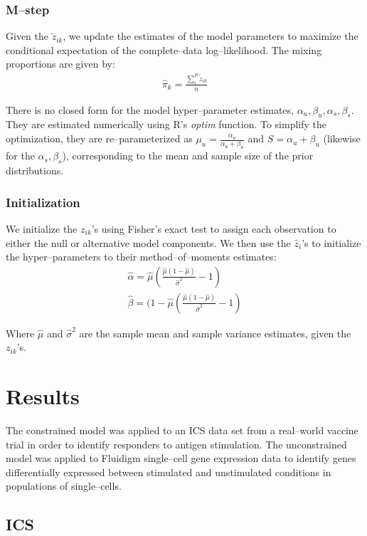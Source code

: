 \documentclass[11pt]{article}
\begin{document}
\subsubsection{M--step}
Given the $\tilde{z}_{ik}$, we update the estimates of the model parameters to maximize the conditional expectation of the complete--data log--likelihood. The mixing proportions are given by:
\begin{align}
\hat\pi_k = \frac{ \sum_i^P \tilde z_{ik}}{n}
\end{align}

There is no closed form for the model hyper--parameter estimates, $\alpha_u,\beta_u,\alpha_s,\beta_s$. They are estimated numerically using R's \textit{optim} function. To simplify the optimization, they are re--parameterized as $\mu_u=\frac{\alpha_u}{\alpha_u+\beta_u}$ and $S=\alpha_u+\beta_u$ (likewise for the $\alpha_s,\beta_s$), corresponding to the mean and sample size of the prior distributions. 

\subsubsection{Initialization}
We initialize the $z_{ik}$'s using Fisher's exact test to assign each observation to either the null or alternative model components. We then use the $\hat{z}_i$'s to initialize the hyper--parameters to their method--of--moments estimates:
\begin{align}
\hat{\alpha} = \hat{\mu}\left(\frac{\hat{\mu}(1-\hat{\mu})}{\hat{\sigma}^2} -1\right)\\
\hat{\beta} =  (1-\hat{\mu}\left(\frac{\hat{\mu}(1-\hat{\mu})}{\hat{\sigma}^2} -1\right)
\end{align}

Where $\hat{\mu}$ and $\hat{\sigma}^2$ are the sample mean and sample variance estimates, given the $z_{ik}$'s.

\section{Results}
The constrained model was applied to an ICS data set from a real--world vaccine trial in order to identify responders to antigen stimulation. The unconstrained model was applied to Fluidigm single--cell gene expression data to identify genes differentially expressed between stimulated and unstimulated conditions in populations of single--cells.

\subsection{ICS}
\end{document}
